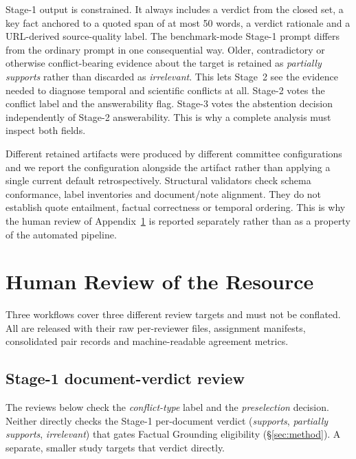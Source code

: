 Stage-1 output is constrained. It always includes a verdict from the closed set, a key fact
anchored to a quoted span of at most 50 words, a verdict rationale and a
URL-derived source-quality label. The benchmark-mode Stage-1 prompt differs from
the ordinary prompt in one consequential way. Older, contradictory or otherwise
conflict-bearing evidence about the target is retained as \textit{partially
supports} rather than discarded as \textit{irrelevant}. This lets Stage~2 see
the evidence needed to diagnose temporal and scientific conflicts at all.
Stage-2 votes the conflict label and the answerability flag. Stage-3 votes the
abstention decision independently of Stage-2 answerability. This is why a
complete analysis must inspect both fields.

Different retained artifacts were produced by different committee
configurations and we report the configuration alongside the artifact rather
than applying a single current default retrospectively. Structural validators
check schema conformance, label inventories and document/note alignment. They do
not establish quote entailment, factual correctness or temporal ordering. This
is why the human review of Appendix~\ref{app:human-review} is reported
separately rather than as a property of the automated pipeline.

\section{Human Review of the Resource}
\label{app:human-review}

Three workflows cover three different review targets and must not be
conflated. All are released with their raw per-reviewer files, assignment
manifests, consolidated pair records and machine-readable agreement metrics.

\subsection{Stage-1 document-verdict review}
\label{app:stage1review}

The reviews below check the \emph{conflict-type} label and the
\emph{preselection} decision. Neither directly checks the Stage-1
per-document verdict (\textit{supports}, \textit{partially supports},
\textit{irrelevant}) that gates Factual Grounding eligibility
(\S\ref{sec:method}). A separate, smaller study targets that verdict
directly.

